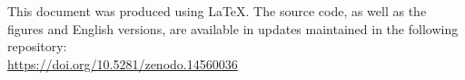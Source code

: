 \documentclass[./main_en.tex]{subfiles}
\begin{document}
\doublespacing %
\large

\newpage
\renewcommand{\headrulewidth}{0pt}
\thispagestyle{fancy}
\fancyhf{} %
\fancyfoot{} %
\fancyfoot[C]{\thepage}

\begin{center}
    \vspace{5mm}
\end{center}
\singlespacing
\normalsize

\setlength{\parskip}{\myparskip}

\noindent This document was produced using \LaTeX. The source code, as well as the figures and English versions, are available in updates maintained in the following repository:\\
\noindent \href{https://doi.org/10.5281/zenodo.14560036}{https://doi.org/10.5281/zenodo.14560036}


\clearpage
\end{document}
